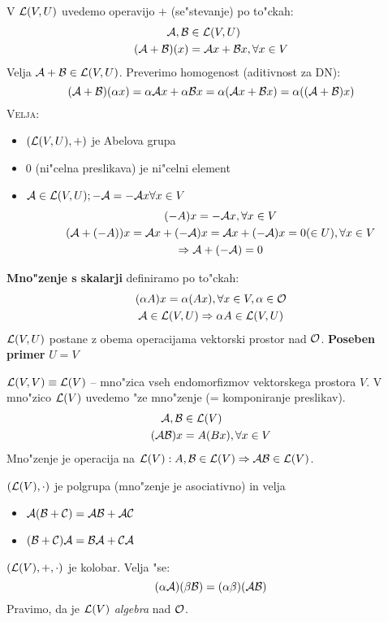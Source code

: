 V $\mathcal{L}(V, U)$ uvedemo operavijo $+$ (se"stevanje) po to"ckah:
\begin{align*}
\mathcal{A}, \mathcal{B} &\in \mathcal{L}(V, U) \\
(\mathcal{A} + \mathcal{B})(x) &= \mathcal{A} x + \mathcal{B} x, \forall x \in V
\end{align*}
Velja $\mathcal{A} + \mathcal{B} \in \mathcal{L}(V, U)$. Preverimo homogenost (aditivnost za DN):
\begin{equation*}
(\mathcal{A} + \mathcal{B})(\alpha x) = \alpha \mathcal{A} x + \alpha \mathcal{B} x = \alpha (\mathcal{A} x + \mathcal{B} x) = \alpha ((\mathcal{A} + \mathcal{B})x)
\end{equation*}
\textsc{Velja:}
\begin{itemize}
	\item $(\mathcal{L}(V, U), +)$ je Abelova grupa
	\item $0$ (ni"celna preslikava) je ni"celni element
	\item $\mathcal{A} \in \mathcal{L}(V, U); -\mathcal{A} = -\mathcal{A} x \forall x \in V$
	\begin{gather*}
		(-A)x = -\mathcal{A} x, \forall x \in V \\
		(\mathcal{A} + (-A))x = \mathcal{A} x + (-\mathcal{A}) x = \mathcal{A} x +(-\mathcal{A})x = 0 (\in U), \forall x \in V \\
		\Rightarrow \mathcal{A} + (-\mathcal{A}) = 0
	\end{gather*}
\end{itemize}
\textbf{Mno"zenje s skalarji} definiramo po to"ckah:
\begin{gather*}
	(\alpha A)x = \alpha (A x), \forall x \in V, \alpha \in \mathcal{O} \\
	\mathcal{A} \in \mathcal{L}(V, U) \Rightarrow \alpha A \in \mathcal{L}(V, U)
\end{gather*}
$\mathcal{L}(V, U)$ postane z obema operacijama vektorski prostor nad $\mathcal{O}$.
%
\textbf{Poseben primer} $U = V$

$\mathcal{L}(V, V) \equiv \mathcal{L}(V)$ -- mno"zica vseh endomorfizmov vektorskega prostora $V$. V mno"zico $\mathcal{L}(V)$ uvedemo "ze mno"zenje (= komponiranje preslikav).
\begin{align*}
\mathcal{A}, \mathcal{B} &\in \mathcal{L}(V) \\
(\mathcal{A} \mathcal{B})x &= A(Bx), \forall x \in V
\end{align*}
Mno"zenje je operacija na $\mathcal{L}(V): A, \mathcal{B} \in \mathcal{L}(V) \Rightarrow \mathcal{A} \mathcal{B} \in \mathcal{L}(V)$.

$(\mathcal{L}(V), \cdot)$ je polgrupa (mno"zenje je asociativno) in velja
\begin{itemize}
	\item $\mathcal{A}(\mathcal{B} + \mathcal{C}) = \mathcal{A} \mathcal{B} + \mathcal{A} \mathcal{C}$
	\item $(\mathcal{B} + \mathcal{C}) \mathcal{A} = \mathcal{B} \mathcal{A} + \mathcal{C} \mathcal{A}$
\end{itemize}
$(\mathcal{L}(V), +, \cdot)$ je kolobar. Velja "se:
\begin{equation*}
(\alpha \mathcal{A}) (\beta \mathcal{B}) = (\alpha \beta) (\mathcal{A} \mathcal{B})
\end{equation*}
Pravimo, da je $\mathcal{L}(V)$ \emph{algebra} nad $\mathcal{O}$.

